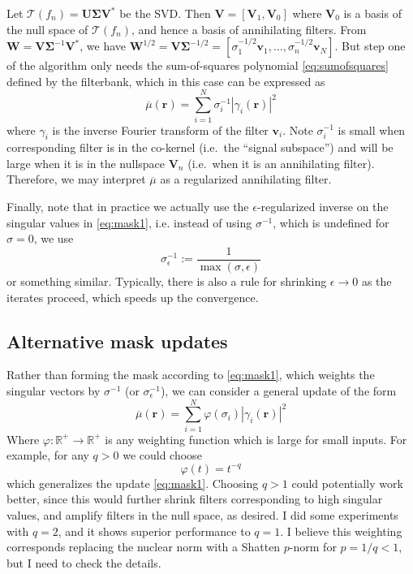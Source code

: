 \documentclass[a4paper]{article}
\begin{document}
Let $\mathcal{T}(f_n) = \mathbf U\boldsymbol \Sigma \mathbf V^*$ be the SVD. Then $\mathbf V = [\mathbf V_1, \mathbf V_0]$ where $\mathbf V_0$ is a basis of the null space of $\mathcal{T}(f_n)$, and hence a basis of annihilating filters. From $\mathbf W = \mathbf V \boldsymbol \Sigma^{-1} \mathbf V^*$, we have $\mathbf W^{1/2} = \mathbf V \boldsymbol \Sigma^{-1/2} = [\sigma_1^{-1/2} \mathbf v_1, \ldots, \sigma_n^{-1/2} \mathbf v_N]$. But step one of the algorithm only needs the sum-of-squares polynomial \eqref{eq:sumofsquares} defined by the filterbank, which in this case can be expressed as
\begin{equation}
\label{eq:mask1}
\overline{\mu}(\mathbf r) = \sum_{i=1}^N \sigma_i^{-1} |\gamma_i(\mathbf r)|^2
\end{equation}
where $\gamma_i$ is the inverse Fourier transform of the filter $\mathbf v_i$. Note $\sigma_i^{-1}$ is small when corresponding filter is in the co-kernel (i.e.\ the ``signal subspace'') and will be large when it is in the nullspace $\mathbf V_n$ (i.e.\ when it is an annihilating filter). Therefore, we may interpret $\overline{\mu}$ as a regularized annihilating filter.

Finally, note that in practice we actually use the $\epsilon$-regularized inverse on the singular values in \eqref{eq:mask1}, i.e. instead of using $\sigma^{-1}$, which is undefined for $\sigma = 0$, we use 
\[
\sigma_\epsilon^{-1} := \frac{1}{\max(\sigma,\epsilon)}
\]
or something similar. Typically, there is also a rule for shrinking $\epsilon\rightarrow 0$ as the iterates proceed, which speeds up the convergence.

\subsection{Alternative mask updates}
Rather than forming the mask according to \eqref{eq:mask1}, which weights the singular vectors by $\sigma^{-1}$ (or $\sigma_\epsilon^{-1}$), we can consider a general update of the form
\begin{equation}
\label{eq:mask2}
\overline{\mu}(\mathbf r) = \sum_{i=1}^N \varphi(\sigma_i) |\gamma_i(\mathbf r)|^2
\end{equation}
Where $\varphi:\mathbb{R}^+\rightarrow \mathbb{R}^+$ is any weighting function which is large for small inputs. For example, for any $q>0$ we could choose
\[
\varphi(t) = t^{-q} 
\]
which generalizes the update \eqref{eq:mask1}. Choosing $q > 1$ could potentially work better, since this would further shrink filters corresponding to high singular values, and amplify filters in the null space, as desired. I did some experiments with $q=2$, and it shows superior performance to $q=1$. I believe this weighting corresponds replacing the nuclear norm with a Shatten $p$-norm for $p=1/q < 1$, but I need to check the details.
\end{document}
